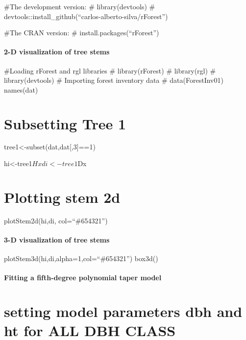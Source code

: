 \documentclass[
]{article}
\begin{document}
\#The development version: \# library(devtools) \#
devtools::install\_github(``carlos-alberto-silva/rForest'')

\#The CRAN version: \# install.packages(``rForest'')

\hypertarget{d-visualization-of-tree-stems}{%
\paragraph{2-D visualization of tree
stems}\label{d-visualization-of-tree-stems}}

\#Loading rForest and rgl libraries \# library(rForest) \# library(rgl)
\# library(devtools) \# Importing forest inventory data \#
data(ForestInv01) names(dat)

\hypertarget{subsetting-tree-1}{%
\section{Subsetting Tree 1}\label{subsetting-tree-1}}

tree1\textless-subset(dat,dat{[},3{]}==1)

hi\textless-tree1\(Hx di<-tree1\)Dx

\hypertarget{plotting-stem-2d}{%
\section{Plotting stem 2d}\label{plotting-stem-2d}}

plotStem2d(hi,di, col=``\#654321'')

\hypertarget{d-visualization-of-tree-stems-1}{%
\paragraph{3-D visualization of tree
stems}\label{d-visualization-of-tree-stems-1}}

plotStem3d(hi,di,alpha=1,col=``\#654321'') box3d()

\hypertarget{fitting-a-fifth-degree-polynomial-taper-model}{%
\paragraph{Fitting a fifth-degree polynomial taper
model}\label{fitting-a-fifth-degree-polynomial-taper-model}}

\hypertarget{setting-model-parameters-dbh-and-ht-for-all-dbh-class}{%
\section{setting model parameters dbh and ht for ALL DBH
CLASS}\label{setting-model-parameters-dbh-and-ht-for-all-dbh-class}}
\end{document}
